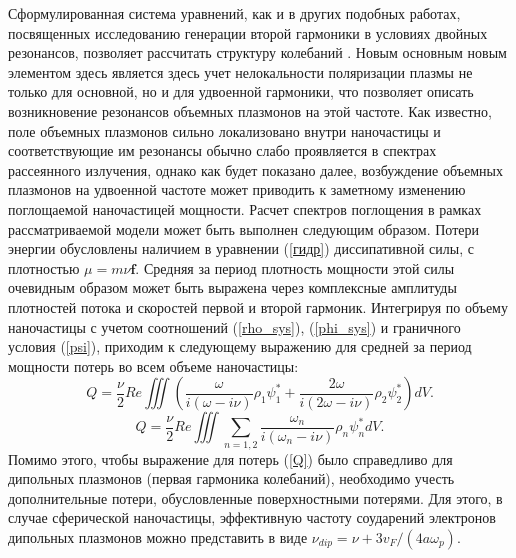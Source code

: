 \documentclass[12pt, a4paper]{article}
\renewcommand{\vec}{\mathbf}
\def \w {\omega}
\begin{document}
Сформулированная система уравнений, как и в других подобных работах, посвященных исследованию генерации второй гармоники в условиях двойных резонансов, позволяет рассчитать структуру колебаний \cite{HuaGersten1986}. Новым основным новым элементом здесь является здесь учет нелокальности поляризации плазмы не только для основной, но и для удвоенной гармоники, что позволяет описать возникновение резонансов объемных плазмонов на этой частоте. Как известно, поле объемных плазмонов сильно локализовано внутри наночастицы и соответствующие им резонансы обычно слабо проявляется в спектрах рассеянного излучения, однако как будет показано далее, возбуждение объемных плазмонов на удвоенной частоте может приводить к заметному изменению поглощаемой наночастицей мощности. Расчет спектров поглощения в рамках рассматриваемой модели может быть выполнен следующим образом. Потери энергии обусловлены наличием в уравнении (\ref{гидр}) диссипативной силы, с плотностью $\mu = m \nu \vec{f}$. Средняя за период плотность мощности этой силы очевидным образом может быть выражена через комплексные амплитуды плотностей потока и скоростей первой и второй гармоник. Интегрируя по объему наночастицы с учетом соотношений (\ref{rho_sys}), (\ref{phi_sys}) и граничного условия (\ref{psi}), приходим к следующему выражению для средней за период мощности потерь во всем объеме наночастицы: 
\begin{equation} 
	\label{Q}
Q = \frac{\nu}{2} Re \iiint (\frac{\w}{i(\w - i \nu)}\rho_1 \psi_1^* + \frac{2\w}{i(2\w - i \nu)}\rho_2 \psi_2^*)dV.
\end{equation}
\begin{equation} 
	Q = \frac{\nu}{2} Re \iiint \sum_{n=1,2}\frac{\w_n}{i(\w_n - i \nu)}\rho_n \psi_n^* dV.
\end{equation}
Помимо этого, чтобы выражение для потерь (\ref{Q}) было справедливо для дипольных плазмонов (первая гармоника колебаний), необходимо учесть дополнительные потери, обусловленные поверхностными потерями. Для этого, в случае сферической наночастицы, эффективную частоту соударений электронов дипольных плазмонов можно представить в виде $\nu_{dip} = \nu + 3 v_F / (4a  \w_p)$.
\end{document}
